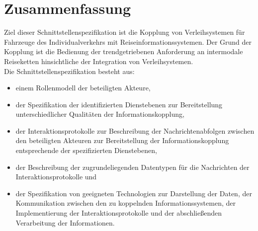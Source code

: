 \chapter{Zusammenfassung}
\label{sec:Zusammenfassung}

Ziel dieser Schnittstellenspezifikation ist die Kopplung von Verleihsystemen für Fahrzeuge des Individualverkehrs mit  Reiseinformationssystemen. Der Grund der Kopplung ist die Bedienung der trendgetriebenen Anforderung an intermodale Reiseketten hinsichtliche der Integration von Verleihsystemen.\\

Die Schnittstellenspezifikation besteht aus:\begin{itemize}
\item einem Rollenmodell der beteiligten Akteure, 
\item der Spezifikation der identifizierten Dienstebenen zur Bereitstellung unterschiedlicher Qualitäten der Informationskopplung, 
\item der Interaktionsprotokolle zur Beschreibung der Nachrichtenabfolgen zwischen den beteiligten Akteuren zur Bereitstellung der Informationskopplung entsprechende der spezifizierten Dienstebenen,
\item der Beschreibung der zugrundeliegenden Datentypen für die Nachrichten der Interaktionsprotokolle und
\item der Spezifikation von geeigneten Technologien zur Darstellung der Daten, der Kommunikation zwischen den zu koppelnden Informationssystemen, der Implementierung der Interaktionsprotokolle und der abschließenden Verarbeitung der Informationen.
\end{itemize}